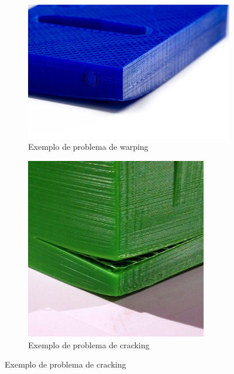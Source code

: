 \documentclass[11pt,a4paper]{article}
\begin{document}
\begin{figure}[H]
    \centering
    \begin{subfigure}[b]{0.4\textwidth}
        \includegraphics[width=\textwidth,cfbox=azul_marcos 4pt 0pt]{FOTOS/EJEMPLO_WARPING}
	\caption*{Exemplo de problema de warping}
    \end{subfigure}
    \qquad %
    \begin{subfigure}[b]{0.4\textwidth}
        \includegraphics[width=\textwidth,cfbox=azul_marcos 4pt 0pt]{FOTOS/EJEMPLO_CRACKING}
	\caption*{Exemplo de problema de cracking}
    \end{subfigure}   
\end{figure}
\end{document}
